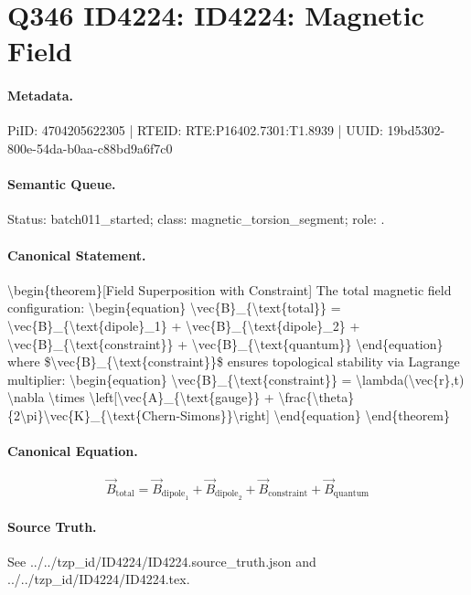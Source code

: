 \section*{Q346 ID4224: ID4224: Magnetic Field}
\paragraph{Metadata.}
PiID: 4704205622305 | RTEID: RTE:P16402.7301:T1.8939 | UUID: 19bd5302-800e-54da-b0aa-c88bd9a6f7c0

\paragraph{Semantic Queue.}
Status: batch011\_started; class: magnetic\_torsion\_segment; role: .

\paragraph{Canonical Statement.}
\textbackslash{}begin\{theorem\}[Field Superposition with Constraint] The total magnetic field configuration: \textbackslash{}begin\{equation\} \textbackslash{}vec\{B\}\_\{\textbackslash{}text\{total\}\} = \textbackslash{}vec\{B\}\_\{\textbackslash{}text\{dipole\}\_1\} + \textbackslash{}vec\{B\}\_\{\textbackslash{}text\{dipole\}\_2\} + \textbackslash{}vec\{B\}\_\{\textbackslash{}text\{constraint\}\} + \textbackslash{}vec\{B\}\_\{\textbackslash{}text\{quantum\}\} \textbackslash{}end\{equation\} where \$\textbackslash{}vec\{B\}\_\{\textbackslash{}text\{constraint\}\}\$ ensures topological stability via Lagrange multiplier: \textbackslash{}begin\{equation\} \textbackslash{}vec\{B\}\_\{\textbackslash{}text\{constraint\}\} = \textbackslash{}lambda(\textbackslash{}vec\{r\},t) \textbackslash{}nabla \textbackslash{}times \textbackslash{}left[\textbackslash{}vec\{A\}\_\{\textbackslash{}text\{gauge\}\} + \textbackslash{}frac\{\textbackslash{}theta\}\{2\textbackslash{}pi\}\textbackslash{}vec\{K\}\_\{\textbackslash{}text\{Chern-Simons\}\}\textbackslash{}right] \textbackslash{}end\{equation\} \textbackslash{}end\{theorem\}

\paragraph{Canonical Equation.}
\[
\begin{equation} \vec{B}_{\text{total}} = \vec{B}_{\text{dipole}_1} + \vec{B}_{\text{dipole}_2} + \vec{B}_{\text{constraint}} + \vec{B}_{\text{quantum}} \end{equation}
\]

\paragraph{Source Truth.}
See ../../tzp\_id/ID4224/ID4224.source\_truth.json and ../../tzp\_id/ID4224/ID4224.tex.
